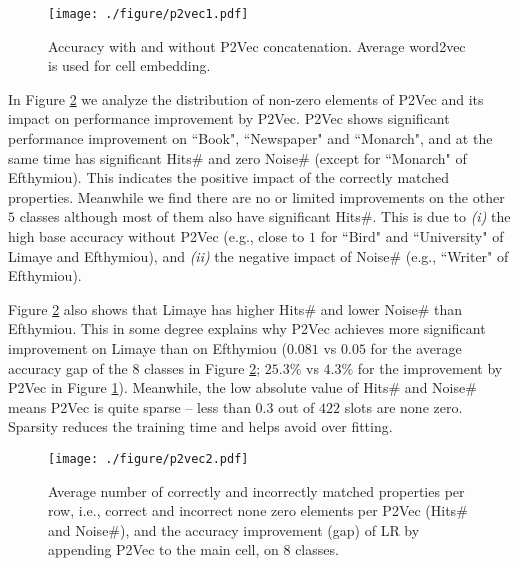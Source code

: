\documentclass{article}
\begin{document}
\vspace{-0.18cm}
\begin{figure}[h]
\centering
\texttt{[image: ./figure/p2vec1.pdf]}
\vspace{-0.6cm}
\caption{\footnotesize
Accuracy with and without P2Vec concatenation.
Average word2vec is used for cell embedding.
}
\label{res:p2vec1}
\end{figure}
\vspace{-0.17cm}

In Figure \ref{res:p2vec2} we analyze the distribution of non-zero elements of P2Vec 
and its impact on performance improvement by P2Vec.
P2Vec shows significant performance improvement on ``Book", ``Newspaper" and ``Monarch",
and at the same time has significant Hits\# and zero Noise\# (except for ``Monarch" of Efthymiou). 
This indicates the positive impact of the correctly matched properties.
Meanwhile we find there are no or limited improvements on the other $5$ classes although most of them also have significant Hits\#.
This is due to
\textit{(i)} the high base accuracy without P2Vec 
(e.g., close to $1$ for ``Bird" and ``University" of Limaye and Efthymiou), 
and \textit{(ii)} the negative impact of Noise\# 
(e.g., ``Writer" of Efthymiou). 

Figure \ref{res:p2vec2} also shows that 
Limaye has higher Hits\# 
and lower Noise\# 
than Efthymiou.
This in some degree explains why P2Vec achieves more significant improvement on Limaye than on Efthymiou 
($0.081$ vs $0.05$ for the average accuracy gap of the $8$ classes in Figure \ref{res:p2vec2}; 
$25.3\%$ vs $4.3\%$ for the improvement by P2Vec in Figure \ref{res:p2vec1}).
Meanwhile, the low absolute value of Hits\# and Noise\# means P2Vec is quite sparse -- 
less than $0.3$ out of $422$ slots are none zero.
Sparsity reduces the training time and helps avoid over fitting.

\vspace{-0.15cm}
\begin{figure}[h]
\centering
\texttt{[image: ./figure/p2vec2.pdf]}
\vspace{-0.68cm}
\caption{\footnotesize
Average number of correctly and incorrectly matched properties per row, i.e., correct and incorrect none zero elements per P2Vec (Hits\# and Noise\#),
and the accuracy improvement (gap) of LR by appending P2Vec to the main cell,
on $8$ classes.
}
\label{res:p2vec2}
\end{figure}
\vspace{-0.2cm}
\end{document}
